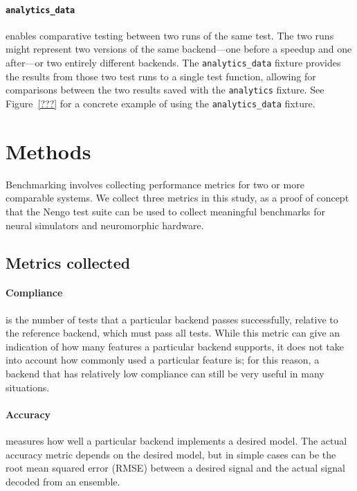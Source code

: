\documentclass{frontiersSCNS}
\begin{document}
\paragraph{\texttt{analytics\_data}}
enables comparative testing between
two runs of the same test.
The two runs might represent two versions
of the same backend---one before a
speedup and one after---or two
entirely different backends.
The \texttt{analytics\_data} fixture
provides the results from those two
test runs to a single test function,
allowing for comparisons
between the two results saved
with the \texttt{analytics} fixture.
See Figure~\ref{???} for a
concrete example of using the
\texttt{analytics\_data} fixture.

\section{Methods}

Benchmarking involves collecting performance metrics
for two or more comparable systems.
We collect three metrics in this study,
as a proof of concept that the Nengo test suite
can be used to collect meaningful benchmarks
for neural simulators and neuromorphic hardware.

\subsection{Metrics collected}

\paragraph{Compliance}
is the number of tests that a particular backend
passes successfully, relative to the reference
backend, which must pass all tests.
While this metric can give an indication
of how many features a particular backend supports,
it does not take into account how commonly used
a particular feature is;
for this reason, a backend that has relatively
low compliance can still be very useful
in many situations.

\paragraph{Accuracy}
measures how well a particular backend
implements a desired model.
The actual accuracy metric depends
on the desired model,
but in simple cases can be
the root mean squared error (RMSE)
between a desired signal
and the actual signal decoded
from an ensemble.
\end{document}

